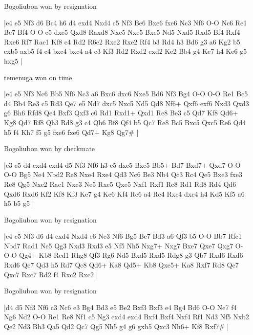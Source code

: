 \showboard

Bogoliubon won by resignation

\makegametitle
|e4 e5 Nf3 d6 Bc4 h6 d4 exd4 Nxd4 c5 Nf3 Be6 Bxe6 fxe6 Nc3 Nf6 O-O Nc6 Re1 Be7 Bf4 O-O e5 dxe5 Qxd8 Raxd8 Nxe5 Nxe5 Bxe5 Nd5 Nxd5 Rxd5 Bf4 Rxf4 Rxe6 Rf7 Rae1 Kf8 c4 Rd2 R6e2 Rxe2 Rxe2 Rf4 b3 Rd4 h3 Bd6 g3 a6 Kg2 b5 cxb5 axb5 f4 c4 bxc4 bxc4 a4 c3 Kf3 Rd2 Rxd2 cxd2 Ke2 Bb4 g4 Ke7 h4 Ke6 g5 hxg5  |

\showboard

temenuga won on time

\makegametitle
|e4 e5 Nf3 Nc6 Bb5 Nf6 Nc3 a6 Bxc6 dxc6 Nxe5 Bd6 Nf3 Bg4 O-O O-O Re1 Bc5 d4 Bb4 Re3 c5 Rd3 Qe7 e5 Nd7 dxc5 Nxc5 Nd5 Qd8 Nf6+ Qxf6 exf6 Nxd3 Qxd3 g6 Bh6 Rfd8 Qe4 Bxf3 Qxf3 c6 Rd1 Rxd1+ Qxd1 Re8 Be3 c5 Qd7 Kf8 Qd6+ Kg8 Qd7 Rf8 Qh3 Rd8 g3 c4 Qh6 Bf8 Qf4 b5 Qc7 Re8 Bc5 Bxc5 Qxc5 Re6 Qd4 h5 f4 Kh7 f5 g5 fxe6 fxe6 Qd7+ Kg8 Qg7\#  |

\showboard

Bogoliubon won by checkmate

\makegametitle
|e3 e5 d4 exd4 exd4 d5 Nf3 Nf6 h3 c5 dxc5 Bxc5 Bb5+ Bd7 Bxd7+ Qxd7 O-O O-O Bg5 Ne4 Nbd2 Re8 Nxe4 Rxe4 Qd3 Nc6 Be3 Nb4 Qc3 Rc4 Qe5 Bxe3 fxe3 Re8 Qg5 Nxc2 Rac1 Nxe3 Ne5 Rxe5 Qxe5 Nxf1 Rxf1 Rc8 Rd1 Rd8 Rd4 Qd6 Qxd6 Rxd6 Kf2 Kf8 Kf3 Ke7 g4 Ke6 Kf4 Rc6 a4 Rc4 Rxc4 dxc4 h4 Kd5 Kf5 a6 h5 b5 g5  |

\showboard

Bogoliubon won by resignation

\makegametitle
|e4 c5 Nf3 d6 d4 cxd4 Nxd4 e6 Nc3 Nf6 Bg5 Be7 Bd3 a6 Qf3 b5 O-O Bb7 Rfe1 Nbd7 Rad1 Ne5 Qg3 Nxd3 Rxd3 e5 Nf5 Nh5 Nxg7+ Nxg7 Bxe7 Qxe7 Qxg7 O-O-O Qg4+ Kb8 Red1 Rhg8 Qf3 Rg6 Nd5 Bxd5 Rxd5 Rdg8 g3 Qb7 Rxd6 Rxd6 Rxd6 Qc7 Qd3 h5 Rd7 Qc8 Qd6+ Ka8 Qd5+ Kb8 Qxe5+ Ka8 Rxf7 Rd8 Qc7 Qxc7 Rxc7 Rd2 f4 Rxc2 Rxc2  |

\showboard

Bogoliubon won by resignation

\makegametitle
|d4 d5 Nf3 Nf6 c3 Nc6 e3 Bg4 Bd3 e5 Be2 Bxf3 Bxf3 e4 Bg4 Bd6 O-O Ne7 f4 Ng6 Nd2 O-O Re1 Re8 Nf1 c5 Ng3 cxd4 exd4 Bxf4 Bxf4 Nxf4 Rf1 Nd3 Nf5 Nxb2 Qe2 Nd3 Bh3 Qa5 Qd2 Qc7 Qg5 Nh5 g4 g6 gxh5 Qxc3 Nh6+ Kf8 Rxf7\#  |

